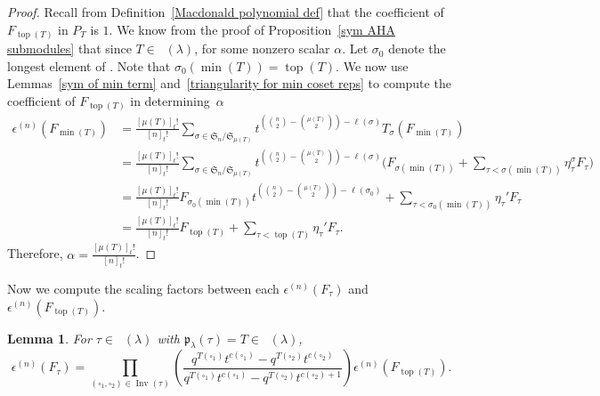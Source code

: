 \documentclass[pdftex]{sigma}
\numberwithin{equation}{section}
\newtheorem{Lemma}[Theorem]{Lemma}
\theoremstyle{definition}
\DeclareMathOperator{\PSYT}{\mathrm{PSYT}_{\geq 0}}
\DeclareMathOperator{\RSSYT}{\mathrm{RSSYT}_{\geq 0}}
\DeclareMathOperator{\Inv}{\mathrm{Inv}}
\DeclareMathOperator{\Top}{\mathrm{top}}
\DeclareMathOperator{\Min}{\mathrm{min}}
\begin{document}
\begin{proof}
 Recall from Definition~\ref{Macdonald polynomial def} that the coefficient of $F_{\Top(T)}$ in $P_T$ is $1$. We know from the proof of Proposition~\ref{sym AHA submodules} that since $T \in \RSSYT(\lambda)$,
 for some nonzero scalar $\alpha$. Let $\sigma_0$ denote the longest element of . Note that $\sigma_0(\Min(T)) = \Top(T)$. We now use Lemmas~\ref{sym of min term} and~\ref{triangularity for min coset reps} to compute the coefficient of $F_{\Top(T)}$ in  determining~$\alpha$
 \begin{align*}
 \epsilon^{(n)}(F_{\Min(T)}) &
 = \frac{[\mu(T)]_{t}!}{[n]_{t}!} \sum_{\sigma \in \mathfrak{S}_n/\mathfrak{S}_{\mu(T)}} t^{ ({n \choose 2} - {\mu(T) \choose 2}) - \ell(\sigma)}T_{\sigma}(F_{\Min(T)}) \\
 & = \frac{[\mu(T)]_{t}!}{[n]_{t}!} \sum_{\sigma \in \mathfrak{S}_n/\mathfrak{S}_{\mu(T)}} t^{ ({n \choose 2} - {\mu(T) \choose 2}) - \ell(\sigma)} \biggl( F_{\sigma(\Min(T))} + \sum_{\tau < \sigma(\Min(T))} \eta_{\tau}^{\sigma} F_{\tau} \biggr) \\
 & = \frac{[\mu(T)]_{t}!}{[n]_{t}!} F_{\sigma_0(\Min(T))}t^{ ({n \choose 2} - {\mu(T) \choose 2}) - \ell(\sigma_0)} + \sum_{\tau < \sigma_0(\Min(T))} \eta_{\tau}' F_{\tau} \\
 & = \frac{[\mu(T)]_{t}!}{[n]_{t}!}F_{\Top(T)} + \sum_{\tau < \Top(T)} \eta_{\tau}' F_{\tau}.
 \end{align*}
 Therefore, $\alpha = \frac{[\mu(T)]_{t}!}{[n]_{t}!}$.
\end{proof}

Now we compute the scaling factors between each $\epsilon^{(n)}(F_{\tau})$ and $\epsilon^{(n)}(F_{\Top(T)})$.

\begin{Lemma}\label{symmetrization coefficients from top element}
 For $\tau \in \PSYT(\lambda)$ with $\mathfrak{p}_{\lambda}(\tau) = T \in \RSSYT(\lambda)$,
 \[
 \epsilon^{(n)}(F_{\tau}) = \prod_{(\square_1,\square_2) \in \Inv(\tau)} \left( \frac{q^{T(\square_1)}t^{c(\square_1)} - q^{T(\square_2)}t^{c(\square_2) }}{q^{T(\square_1)}t^{c(\square_1)} - q^{T(\square_2)}t^{c(\square_2) +1}} \right) \epsilon^{(n)}(F_{\Top(T)}).
 \]

\end{Lemma}
\end{document}
